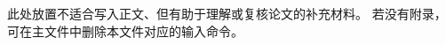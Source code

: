 \begin{yibinappendices}

此处放置不适合写入正文、但有助于理解或复核论文的补充材料。
若没有附录，可在主文件中删除本文件对应的输入命令。
\end{yibinappendices}
